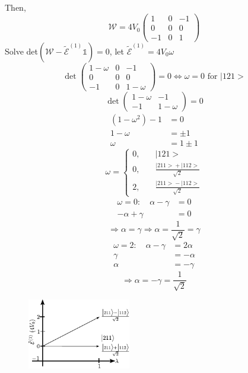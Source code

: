 \documentclass[12pt,fancychapters]{report}
\numberwithin{equation}{section}
\begin{document}
Then, 
\begin{equation}
  \mathcal{W} = 4V_0 
  \begin{pmatrix}
  1 & 0 & -1\\
  0 & 0 & 0\\
  -1 & 0 & 1
  \end{pmatrix}
\end{equation}
Solve det$(\mathcal{W}-\tilde{\mathcal{E}}^{(1)} \mathbb{1}) = 0$, let $\tilde{\mathcal{E}}^{(1)}
 = 4V_0\omega$
 \[
  \det
  \begin{pmatrix}
  1-\omega & 0 & -1\\
  0 & 0 & 0\\
  -1 & 0 & 1-\omega
  \end{pmatrix}
  = 0 \Longleftrightarrow \omega = 0\,\,\text{for}\,\,\big|121\big> 
 \]
 \[
  \det 
  \begin{pmatrix}
  1-\omega & -1\\
  -1 & 1-\omega
\end{pmatrix}
= 0
 \]
\begin{align*}
  \left(1-\omega^2 \right) - 1 &= 0\\
  1 - \omega & = \pm 1\\
  \omega & = 1 \pm 1
\end{align*}
\[
\omega = 
\begin{cases}
    0,& \quad \big|121\big>\\
    0,& \quad \frac{\big|211\big> + \big|112\big>}{\sqrt{2}}\\
    2,& \quad \frac{\big|211\big> - \big|112\big>}{\sqrt{2}}
  \end{cases}
\]
\begin{align*}
  \omega = 0: \quad \alpha - \gamma &= 0\\
  -\alpha + \gamma & = 0
\end{align*}
\[
  \Rightarrow \alpha = \gamma \Rightarrow \alpha = \frac{1}{\sqrt{2}} = \gamma
\]
\begin{align*}
  \omega = 2: \quad \alpha- \gamma  &= 2 \alpha\\
  \gamma &= -\alpha\\
  \alpha &= -\gamma
\end{align*}
\[
  \Rightarrow \alpha = -\gamma = \frac{1}{\sqrt{2}}
\]
\begin{figure}[H]
  \centering
	\includegraphics[width=0.4\textwidth]{../Figures/EN02.pdf}
\end{figure}
\end{document}
